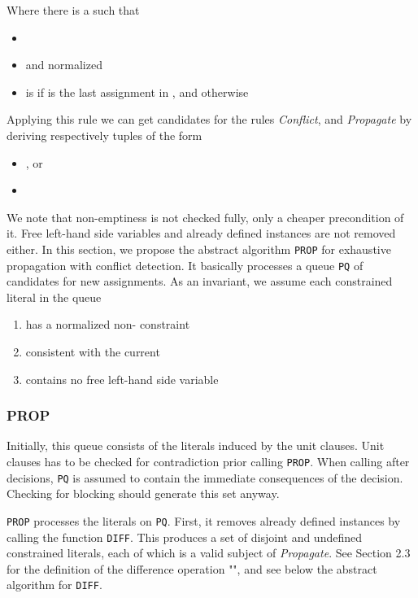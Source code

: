 \documentclass[a4paper]{article}
\begin{document}
{Where there is a  such that
\begin{itemize}
	\item 
	\item  and normalized
	\item  is  if  is the last assignment in , and  otherwise
\end{itemize}
Applying this rule we can get candidates for the rules \emph{Conflict}, and \emph{Propagate} by deriving respectively tuples of the form
\begin{itemize}
	\item , or
	\item 
\end{itemize}
We note that non-emptiness is not checked fully, only a cheaper precondition of it. 
Free left-hand side variables and already defined instances are not removed either.
In this section, we propose the abstract algorithm \texttt{PROP} for exhaustive propagation with conflict detection.
It basically processes a queue \texttt{PQ} of candidates for new assignments. 
As an invariant, we assume each constrained literal in the queue 
\begin{enumerate}
	\item has a normalized non- constraint
	\item consistent with the current 
	\item contains no free left-hand side variable
\end{enumerate}
\subsubsection*{PROP}
Initially, this queue consists of the literals induced by the unit clauses. 
Unit clauses has to be checked for contradiction prior calling \texttt{PROP}.
When calling after decisions, \texttt{PQ} is assumed to contain the 
immediate consequences of the decision. 
Checking for blocking should generate this set anyway.

\texttt{PROP} processes the literals on \texttt{PQ}.
First, it removes already defined instances by calling the function \texttt{DIFF}.
This produces a set of disjoint and undefined constrained literals, each of which
is a valid subject of \emph{Propagate}.
See Section 2.3 for the definition of the difference operation "", and see below 
the abstract algorithm for \texttt{DIFF}.

}
\end{document}
